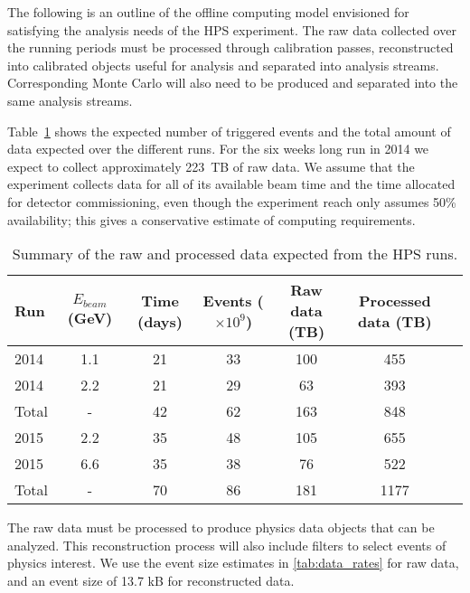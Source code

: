 
The following is an outline of the offline computing model envisioned for satisfying the analysis needs of the HPS experiment. The raw data collected over the running periods must be processed through calibration passes, reconstructed into calibrated objects useful for analysis and separated into analysis streams. Corresponding Monte Carlo will also need to be produced and separated into the same analysis streams.

Table~\ref{tab:data_volume} shows the expected number of triggered events and
the total amount of data expected over the 
different runs. For the six weeks long run in 2014 we expect to collect approximately 223~TB of raw data. 
We assume that the experiment collects data for all of its available beam time and the time allocated for detector commissioning, even though the experiment reach only assumes 50\% availability; this gives a conservative estimate of computing requirements.
\begin{table}[]
\centering
\begin{tabular}{|l|c|c|c|c|c|c|}
\hline
Run & $E_{beam}$ (GeV) & Time (days) & Events ($\times 10^9$) & Raw data (TB) & Processed data (TB)\\
\hline
2014 & 1.1 & 21 & 33 & 100 & 455 \\
2014 & 2.2 & 21 & 29 & 63 & 393  \\
\hline
Total & - & 42 & 62 & 163  & 848 \\
\hline
2015 & 2.2 & 35 & 48 & 105 & 655 \\
2015 & 6.6 & 35 & 38 & 76 & 522 \\
\hline
Total & - & 70 & 86 & 181 & 1177 \\
\hline
\end{tabular}
\caption{{\small Summary of the raw and processed data expected from the HPS runs. }}
\label{tab:data_volume}
\end{table}
The raw data must be processed to produce physics data objects that can be analyzed. This reconstruction process will also include filters to select events of physics interest. We use the event size estimates in \ref{tab:data_rates} for raw data, and an event size of 13.7 kB for reconstructed data.



